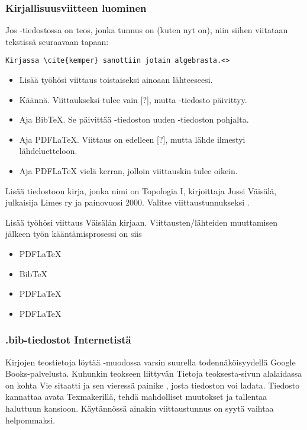 \begin{fframe}
    \frametitle{Kirjallisuusviitteen luominen}
    Jos -tiedostossa on teos, jonka tunnus on  (kuten nyt on), niin siihen viitataan tekstissä seuraavaan tapaan:
    \begin{lstlisting}
Kirjassa \cite{kemper} sanottiin jotain algebrasta.<>
    \end{lstlisting}
    \begin{harj}
        \begin{itemize}
            \item Lisää työhösi viittaus toistaiseksi ainoaan lähteeseesi.
            \item Käännä. Viittaukseksi tulee vain [?], mutta -tiedosto päivittyy.
            \item Aja BibTeX. Se päivittää -tiedoston uuden -tiedoston pohjalta.
            \item Aja PDFLaTeX. Viittaus on edelleen [?], mutta lähde ilmestyi lähdeluetteloon.
            \item Aja PDFLaTeX vielä kerran, jolloin viittauskin tulee oikein.
        \end{itemize}
    \end{harj}
\end{fframe}

\begin{fframe}
    \begin{harj}
        Lisää tiedostoon  kirja, jonka nimi on Topologia I, kirjoittaja Jussi Väisälä, julkaisija Limes ry ja painovuosi 2000. Valitse viittaustunnukseksi .
    \end{harj}
    \begin{harj}
        Lisää työhösi viittaus Väisälän kirjaan. Viittausten/lähteiden muuttamisen jälkeen työn kääntämisprosessi on siis
        \begin{itemize}
            \item PDFLaTeX
            \item BibTeX
            \item PDFLaTeX
            \item PDFLaTeX
        \end{itemize}
    \end{harj}
\end{fframe}

\begin{fframe}
    \frametitle{.bib-tiedostot Internetistä}
    Kirjojen teostietoja löytää \BibTeX -muodossa varsin suurella todennäköisyydellä Google Books-palvelusta. 
    \pause
    \vaihto
    Kuhunkin teokseen liittyvän Tietoja teoksesta-sivun alalaidassa on kohta Vie sitaatti ja sen vieressä painike \BibTeX, josta tiedoston voi ladata.
    \pause
    \vaihto
    Tiedosto kannattaa avata Texmakerillä, tehdä mahdolliset muutokset ja tallentaa haluttuun kansioon. 
    \vaihto
    Käytännössä ainakin viittaustunnus on syytä vaihtaa helpommaksi.
\end{fframe}

